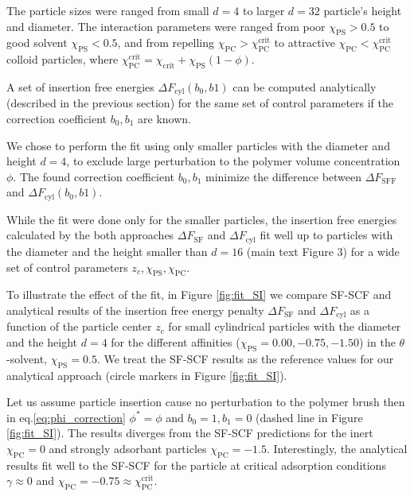 \documentclass[10pt, a4paper]{article}
\begin{document}
\begin{multicols}{2}
The particle sizes were ranged from small $d=4$ to  larger $d=32$ particle's height and diameter.
The interaction parameters were ranged from poor $\chi_{\textrm{PS}} > 0.5$ to good solvent $\chi_{\textrm{PS}} < 0.5$, and from repelling  $\chi_{\textrm{PC}} > \chi_{\textrm{PC}}^{\textrm{crit}}$ to attractive $\chi_{\textrm{PC}} < \chi_{\textrm{PC}}^{\textrm{crit}}$ colloid particles, where $\chi_{\textrm{PC}}^{\textrm{crit}} = \chi_{\textrm{crit}} + \chi_{\textrm{PS}}(1-\phi)$.

A set of insertion free energies $\Delta F_{\textrm{cyl}}(b_0, b1)$ can be computed analytically (described in the previous section) for the same set of control parameters if the correction coefficient $b_0, b_1$ are known.

We chose to perform the fit using only smaller particles with the diameter and height $d=4$, to exclude large perturbation to the polymer volume concentration $\phi$. The found correction coefficient $b_0, b_1$ minimize the difference between $\Delta F_{\textrm{SFF}}$ and $\Delta F_{\textrm{cyl}}(b_0, b1)$.

While the fit were done only for the smaller particles, the insertion free energies calculated by the both approaches $\Delta F_{\textrm{SF}}$ and $\Delta F_{\textrm{cyl}}$ fit well up to particles with the diameter and the height smaller than $d=16$ (main text Figure 3) for a wide set of control parameters $z_c, \chi_{\textrm{PS}}, \chi_{\textrm{PC}}$.

To illustrate the effect of the fit, in Figure \ref{fig:fit_SI} we compare SF-SCF and analytical results of the insertion free energy penalty $\Delta F_{\textrm{SF}}$ and $\Delta F_{\textrm{cyl}}$ as a function of the particle center $z_c$ for small cylindrical particles with the diameter and the height $d=4$ for the different affinities ($\chi_{\textrm{PS}} = 0.00, -0.75, -1.50$) in the $\theta$-solvent, $\chi_{\textrm{PS}} = 0.5$.
We treat the SF-SCF results as the reference values for our analytical approach (circle markers in Figure \ref{fig:fit_SI}).

Let us assume particle insertion cause no perturbation to the polymer brush then in eq.\ref{eq:phi_correction} $\phi^{\ast} = \phi$ and $b_0 = 1, b_1 = 0$ (dashed line in Figure \ref{fig:fit_SI}).
The results diverges from the SF-SCF predictions for the inert $\chi_{\textrm{PC}} = 0$ and strongly adsorbant particles $\chi_{\textrm{PC}} = -1.5$.
Interestingly, the analytical results fit well to the SF-SCF for the particle at critical adsorption conditions $\gamma \approx 0$ and $\chi_{\textrm{PC}} = -0.75 \approx \chi_{\textrm{PC}}^{\textrm{crit}}$.


\end{multicols}
\end{document}
